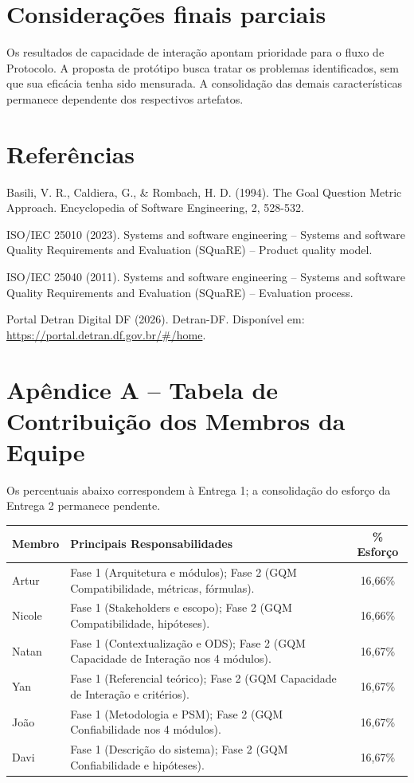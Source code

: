 \documentclass[12pt]{article}
\begin{document}
\section{Considerações finais parciais}
Os resultados de capacidade de interação apontam prioridade para o fluxo de Protocolo. A proposta de protótipo busca tratar os problemas identificados, sem que sua eficácia tenha sido mensurada. A consolidação das demais características permanece dependente dos respectivos artefatos.

\section*{Referências}
\begin{description}
    \item Basili, V. R., Caldiera, G., \& Rombach, H. D. (1994). The Goal Question Metric Approach. Encyclopedia of Software Engineering, 2, 528-532.
    \item ISO/IEC 25010 (2023). Systems and software engineering -- Systems and software Quality Requirements and Evaluation (SQuaRE) -- Product quality model.
    \item ISO/IEC 25040 (2011). Systems and software engineering -- Systems and software Quality Requirements and Evaluation (SQuaRE) -- Evaluation process.
    \item Portal Detran Digital DF (2026). Detran-DF. Disponível em: \url{https://portal.detran.df.gov.br/#/home}.
\end{description}

\appendix
\section*{Apêndice A -- Tabela de Contribuição dos Membros da Equipe}
Os percentuais abaixo correspondem à Entrega 1; a consolidação do esforço da Entrega 2 permanece pendente.
\begin{table}[h]
\centering
\begin{tabular}{|l|p{8.5cm}|c|}
\hline
\textbf{Membro} & \textbf{Principais Responsabilidades} & \textbf{\% Esforço} \\ \hline
Artur & Fase 1 (Arquitetura e módulos); Fase 2 (GQM Compatibilidade, métricas, fórmulas). & 16,66\% \\ \hline
Nicole & Fase 1 (Stakeholders e escopo); Fase 2 (GQM Compatibilidade, hipóteses). & 16,66\% \\ \hline
Natan & Fase 1 (Contextualização e ODS); Fase 2 (GQM Capacidade de Interação nos 4 módulos). & 16,67\% \\ \hline
Yan & Fase 1 (Referencial teórico); Fase 2 (GQM Capacidade de Interação e critérios). & 16,67\% \\ \hline
João & Fase 1 (Metodologia e PSM); Fase 2 (GQM Confiabilidade nos 4 módulos). & 16,67\% \\ \hline
Davi & Fase 1 (Descrição do sistema); Fase 2 (GQM Confiabilidade e hipóteses). & 16,67\% \\ \hline
\end{tabular}
\end{table}
\end{document}
